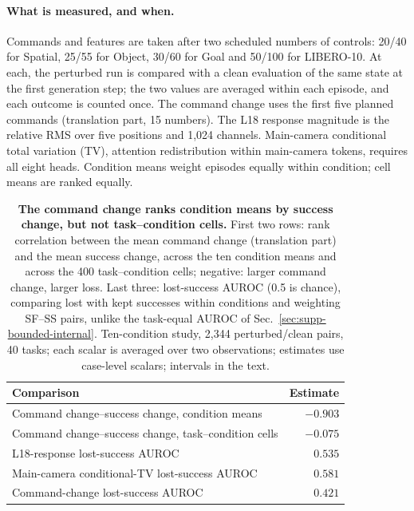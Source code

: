 \paragraph{What is measured, and when.}
Commands and features are taken after two scheduled numbers of controls: 20/40 for Spatial, 25/55 for Object, 30/60 for Goal and 50/100 for LIBERO-10. At each, the perturbed run is compared with a clean evaluation of the same state at the first generation step; the two values are averaged within each episode, and each outcome is counted once. The command change uses the first five planned commands (translation part, 15 numbers). The L18 response magnitude is the relative RMS over five positions and 1,024 channels. Main-camera conditional total variation (TV), attention redistribution within main-camera tokens, requires all eight heads. Condition means weight episodes equally within condition; cell means are ranked equally.

\begin{table}[t]
\centering\small
\caption{\textbf{The command change ranks condition means by success change, but not task--condition cells.} First two rows: rank correlation between the mean command change (translation part) and the mean success change, across the ten condition means and across the 400 task--condition cells; negative: larger command change, larger loss. Last three: lost-success AUROC (0.5 is chance), comparing lost with kept successes within conditions and weighting SF--SS pairs, unlike the task-equal AUROC of Sec.~\ref{sec:supp-bounded-internal}. Ten-condition study, 2,344 perturbed/clean pairs, 40 tasks; each scalar is averaged over two observations; estimates use case-level scalars; intervals in the text.}
\label{tab:legacy-aggregation-readout}
\setlength{\tabcolsep}{3pt}
\begin{tabular}{p{}r}
\toprule
Comparison & Estimate\\
\midrule
Command change--success change, condition means & $-0.903$\\
Command change--success change, task--condition cells & $-0.075$\\
L18-response lost-success AUROC & $0.535$\\
Main-camera conditional-TV lost-success AUROC & $0.581$\\
Command-change lost-success AUROC & $0.421$\\
\bottomrule
\end{tabular}
\end{table}

